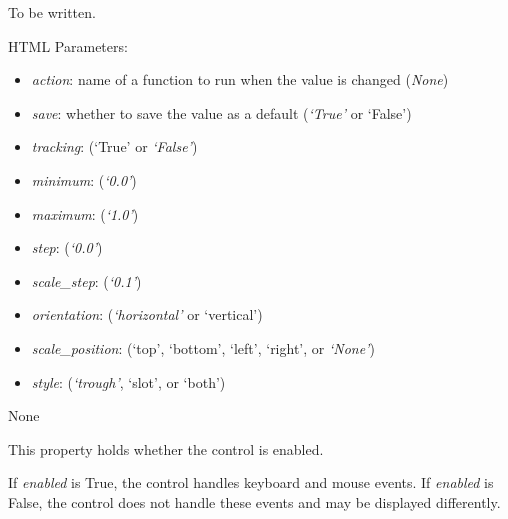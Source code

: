 \documentclass[letterpaper,10pt,english]{sphinxmanual}
\begin{document}
\begin{fulllineitems}
\label{api:qwt.Slider}
To be written.

HTML Parameters:
\begin{itemize}
\item {} 
\emph{action}: name of a function to run when the value is changed (\emph{None})

\item {} 
\emph{save}: whether to save the value as a default (\emph{`True'} or `False')

\item {} 
\emph{tracking}: (`True' or \emph{`False'})

\item {} 
\emph{minimum}: (\emph{`0.0'})

\item {} 
\emph{maximum}: (\emph{`1.0'})

\item {} 
\emph{step}: (\emph{`0.0'})

\item {} 
\emph{scale\_step}: (\emph{`0.1'})

\item {} 
\emph{orientation}: (\emph{`horizontal'} or `vertical')

\item {} 
\emph{scale\_position}: (`top', `bottom', `left', `right', or \emph{`None'})

\item {} 
\emph{style}: (\emph{`trough'}, `slot', or `both')

\end{itemize}

\begin{fulllineitems}
\label{api:qwt.Slider.action}
None

\end{fulllineitems}


\begin{fulllineitems}
\label{api:qwt.Slider.enabled}
This property holds whether the control is enabled.

If \emph{enabled} is True, the control handles keyboard and mouse events.
If \emph{enabled} is False, the control does not handle these events and may
be displayed differently.


\end{fulllineitems}
\end{fulllineitems}
\end{document}
